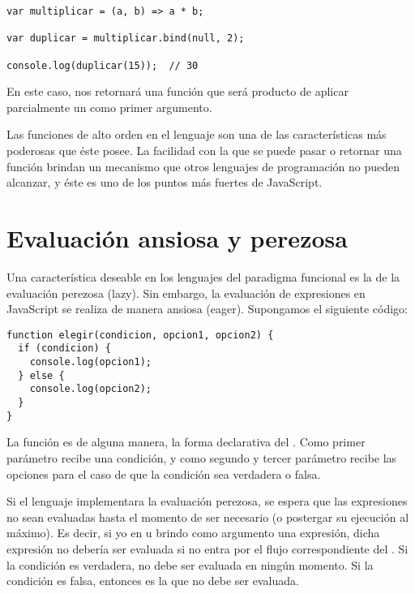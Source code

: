 \begin{lstlisting}[title={Aplicación parcial usando \code{bind}}]
var multiplicar = (a, b) => a * b;

var duplicar = multiplicar.bind(null, 2);

console.log(duplicar(15));	// 30
\end{lstlisting}

En este caso,  nos retornará una función que será producto de aplicar parcialmente un  como primer argumento. 

Las funciones de alto orden en el lenguaje son una de las características más poderosas que éste posee. La facilidad con la que se puede pasar o retornar una función brindan un mecanismo que otros lenguajes de programación no pueden alcanzar, y éste es uno de los puntos más fuertes de JavaScript.

\section{Evaluación ansiosa y perezosa}

Una característica deseable en los lenguajes del paradigma funcional es la de la evaluación perezosa (lazy). Sin embargo, la evaluación de expresiones en JavaScript se realiza de manera ansiosa (eager). Supongamos el siguiente código:

\begin{lstlisting}[title={Creando una función condicional}]
function elegir(condicion, opcion1, opcion2) {
  if (condicion) {
    console.log(opcion1);
  } else {
    console.log(opcion2);
  }
}
\end{lstlisting}

La función  es de alguna manera, la forma declarativa del . Como primer parámetro recibe una condición, y como segundo y tercer parámetro recibe las opciones para el caso de que la condición sea verdadera o falsa.

Si el lenguaje implementara la evaluación perezosa, se espera que las expresiones no sean evaluadas hasta el momento de ser necesario (o postergar su ejecución al máximo). Es decir, si yo en  u  brindo como argumento una expresión, dicha expresión no debería ser evaluada si no entra por el flujo correspondiente del . Si la condición es verdadera,  no debe ser evaluada en ningún momento. Si la condición es falsa, entonces es  la que no debe ser evaluada.

